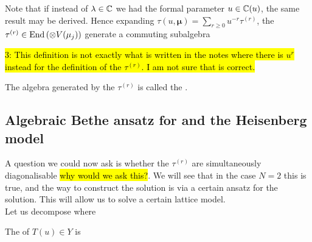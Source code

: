 \documentclass{article}
\begin{document}
Note that if instead of $\lambda\in \mathbb{C}$ we had the formal parameter $u \in \mathbb{C}(u)$, the same result may be derived. Hence expanding $\tau(u,\bm{\mu}) = \sum_{r \geq 0} u^{-r} \tau^{(r)}$, the $\tau^{(r)} \in \operatorname{End} \left( \otimes V(\mu_j) \right)$ generate a commuting subalgebra

\hl{3: This definition is not exactly what is written in the notes where there is $u^r$ instead for the definition of the $\tau^{(r)}$. I am not sure that is correct.}

\begin{definition}
The algebra generated by the $\tau^{(r)}$ is called the .
\end{definition}

\subsection{Algebraic Bethe ansatz for  and the Heisenberg model}

A question we could now ask is whether the $\tau^{(r)}$ are simultaneously diagonalisable \hl{why would we ask this?}. We will see that in the case $N=2$ this is true, and the way to construct the solution is via a certain ansatz for the solution. This will allow us to solve a certain lattice model.  \\
Let us decompose 
where 

\begin{definition}
The  of $T(u) \in Y$ is 
\end{definition}
\end{document}

